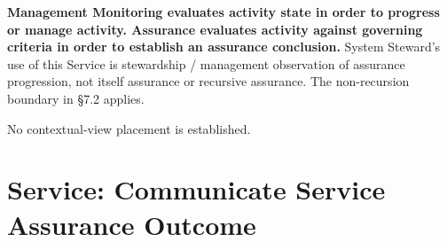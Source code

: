 \textbf{Management Monitoring evaluates activity state in order to progress or manage activity. Assurance evaluates activity against governing criteria in order to establish an assurance conclusion.} System Steward's use of this Service is stewardship /\allowbreak{} management observation of assurance progression, not itself assurance or recursive assurance. The non-recursion boundary in §7.2 applies.






No contextual-view placement is established.


\section{Service: Communicate Service Assurance Outcome}
\label{service:communicate-service-assurance-outcome}
\begingroup\small\setlength{\TableWidth}{\dimexpr\linewidth-6\tabcolsep-4\arrayrulewidth\relax}
